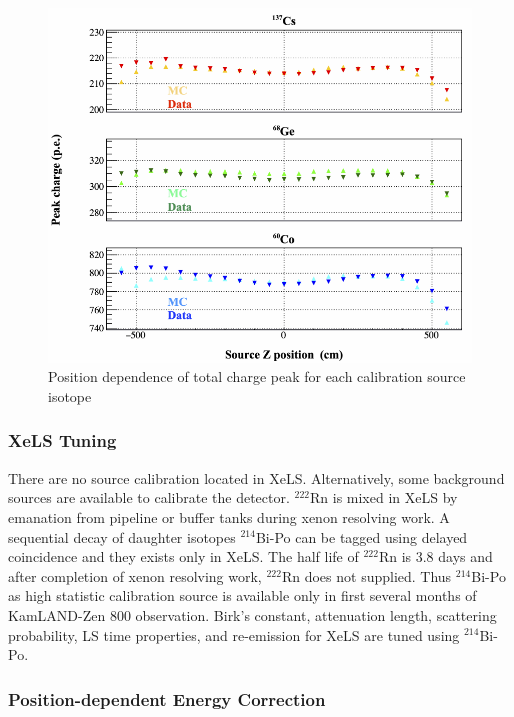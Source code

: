 \begin{figure}[htb]
	\centering
	\includegraphics[scale=0.35]{calib_source_pos.png}
	\caption{Position dependence of total charge peak for each calibration source isotope \cite{ozaki_phd}}
	\label{fig:calib_source_pos}
\end{figure}

\subsubsection*{XeLS Tuning}
There are no source calibration located in XeLS. Alternatively, some background sources are available to calibrate the detector. $^{222}$Rn is mixed in XeLS by emanation from pipeline or buffer tanks during xenon resolving work. A sequential decay of daughter isotopes $^{214}$Bi-Po can be tagged using delayed coincidence and they exists only in XeLS. The half life of $^{222}$Rn is 3.8 days and after completion of xenon resolving work, $^{222}$Rn does not supplied. Thus $^{214}$Bi-Po as high statistic calibration source is available only in first several months of KamLAND-Zen 800 observation. Birk's constant, attenuation length, scattering probability, LS time properties, and re-emission for XeLS are tuned using $^{214}$Bi-Po.

\subsubsection*{Position-dependent Energy Correction}

